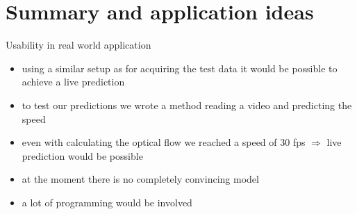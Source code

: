 \section{Summary and application ideas}

\begin{frame}{Usability in real world application}
	\begin{itemize}
		\item using a similar setup as for acquiring the test data it would be possible to achieve a live prediction
		\item to test our predictions we wrote a method reading a video and predicting the speed
		\item even with calculating the optical flow we reached a speed of 30 fps $\Rightarrow$ live prediction would be possible
		\item at the moment there is no completely convincing model
		\item a lot of programming would be involved
	\end{itemize}
\end{frame}